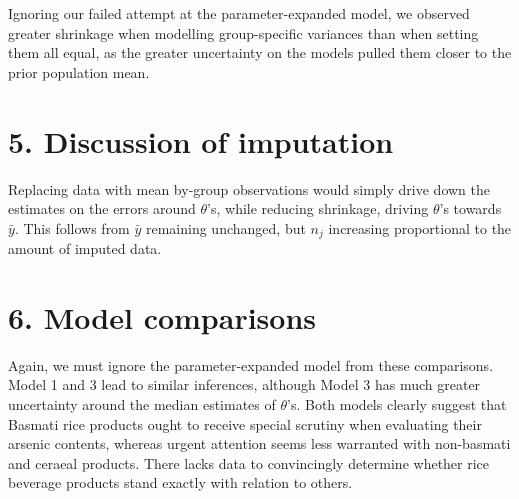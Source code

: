 \documentclass[]{article}
\begin{document}
Ignoring our failed attempt at the parameter-expanded model, we observed
greater shrinkage when modelling group-specific variances than when
setting them all equal, as the greater uncertainty on the models pulled
them closer to the prior population mean.

\section{5. Discussion of imputation}

Replacing data with mean by-group observations would simply drive down
the estimates on the errors around \(\theta\)'s, while reducing
shrinkage, driving \(\theta\)'s towards \(\bar{y}\). This follows from
\(\bar{y}\) remaining unchanged, but \(n_j\) increasing proportional to
the amount of imputed data.

\section{6. Model comparisons}

Again, we must ignore the parameter-expanded model from these
comparisons. Model 1 and 3 lead to similar inferences, although Model 3
has much greater uncertainty around the median estimates of
\(\theta\)'s. Both models clearly suggest that Basmati rice products
ought to receive special scrutiny when evaluating their arsenic
contents, whereas urgent attention seems less warranted with non-basmati
and ceraeal products. There lacks data to convincingly determine whether
rice beverage products stand exactly with relation to others.
\end{document}
